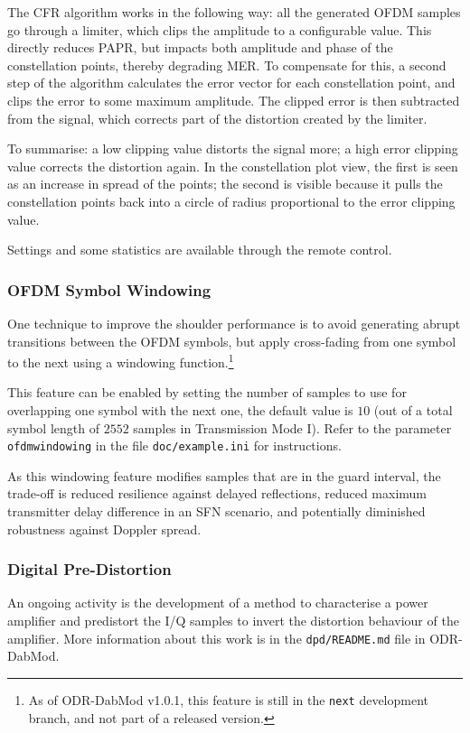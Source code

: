 The CFR algorithm works in the following way: all the generated OFDM samples go
through a limiter, which clips the amplitude to a configurable value. This
directly reduces PAPR, but impacts both amplitude and phase of the constellation
points, thereby degrading MER. To compensate for this, a second step of the
algorithm calculates the error vector for each constellation point, and clips
the error to some maximum amplitude. The clipped error is then subtracted from
the signal, which corrects part of the distortion created by the limiter.

To summarise: a low clipping value distorts the signal more; a high error
clipping value corrects the distortion again.
In the constellation plot view, the first is seen as an increase in spread of
the points; the second is visible because it pulls the constellation points back
into a circle of radius proportional to the error clipping value.

Settings and some statistics are available through the remote control.

\subsubsection{OFDM Symbol Windowing}
One technique to improve the shoulder performance is to avoid generating abrupt
transitions between the OFDM symbols, but apply cross-fading from one symbol to
the next using a windowing function.\footnote{As of ODR-DabMod v1.0.1, this feature is
still in the \texttt{next} development branch, and not part of a released
version.}

This feature can be enabled by setting the number of samples to use for
overlapping one symbol with the next one, the default value is $10$ (out of a
total symbol length of $2552$ samples in Transmission Mode I). Refer to the
parameter \verb+ofdmwindowing+ in the file \verb+doc/example.ini+ for
instructions.

As this windowing feature modifies samples that are in the guard interval, the
trade-off is reduced resilience against delayed reflections, reduced maximum
transmitter delay difference in an SFN scenario, and potentially diminished
robustness against Doppler spread.

\subsubsection{Digital Pre-Distortion}
An ongoing activity is the development of a method to characterise a power
amplifier and predistort the I/Q samples to invert the distortion behaviour of
the amplifier. More information about this work is in the \verb+dpd/README.md+
file in ODR-DabMod.


